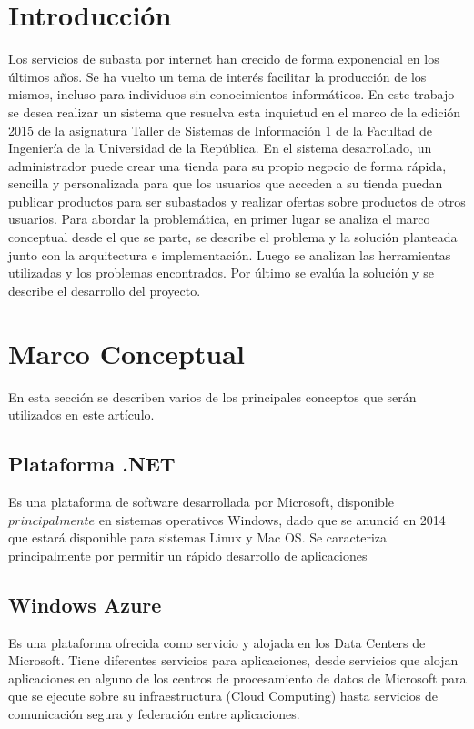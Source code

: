 \documentclass[journal]{IEEEtran}
\begin{document}
\section{Introducción}
Los servicios de subasta por internet han crecido de forma exponencial en los últimos años. Se ha vuelto un tema de interés facilitar la producción de los mismos, incluso para individuos sin conocimientos informáticos.
En este trabajo se desea realizar un sistema que resuelva esta inquietud en el marco de la edición 2015 de la asignatura Taller de Sistemas de Información 1 de la Facultad de Ingeniería de la Universidad de la República. En el sistema desarrollado, un administrador puede crear una tienda para su propio negocio de forma rápida, sencilla y personalizada para que los usuarios que acceden a su tienda puedan publicar productos para ser subastados y realizar ofertas sobre productos de otros usuarios.
Para abordar la problemática, en primer lugar se analiza el marco conceptual desde el que se parte, se describe el problema y la solución planteada junto con la arquitectura e implementación. Luego se analizan las herramientas utilizadas y los problemas encontrados. Por último se evalúa la solución y se describe el desarrollo del proyecto. 

\section{Marco Conceptual}
En esta sección se describen varios de los principales conceptos que serán utilizados en este artículo.

\subsection{Plataforma .NET}
Es una plataforma de software desarrollada por Microsoft, disponible $principalmente$ en sistemas operativos Windows, dado que se anunció en 2014 que estará disponible para sistemas Linux y Mac OS. Se caracteriza principalmente por permitir un rápido desarrollo de aplicaciones

\subsection{Windows Azure}
Es una plataforma ofrecida como servicio y alojada en los Data Centers de Microsoft. 
Tiene diferentes servicios para aplicaciones, desde servicios que alojan aplicaciones en alguno de los centros de procesamiento de datos de Microsoft para que se ejecute sobre su infraestructura (Cloud Computing) hasta servicios de comunicación segura y federación entre aplicaciones.
\end{document}
